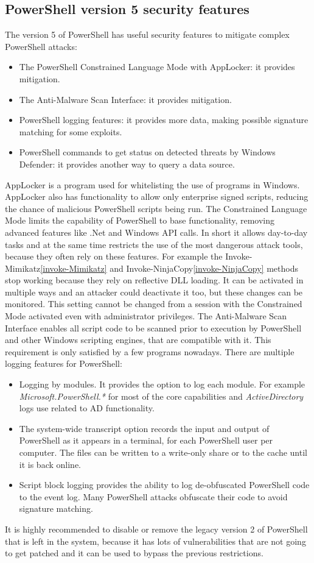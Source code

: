 \subsection{PowerShell version 5 security features}
The version 5 of PowerShell has useful security features to mitigate complex PowerShell attacks\cite{powershell_adsecurity}:
\begin{itemize}
	\item The PowerShell Constrained Language Mode with AppLocker: it provides mitigation.
	\item The Anti-Malware Scan Interface: it provides mitigation.
	\item PowerShell logging features: it provides more data, making possible signature matching for some exploits.
	\item PowerShell commands to get status on detected threats by Windows Defender: it provides another way to query a data source.
\end{itemize}
\linej
AppLocker is a program used for whitelisting the use of programs in Windows.
AppLocker also has functionality to allow only enterprise signed scripts, reducing the chance of malicious PowerShell scripts being run.
\linej
The Constrained Language Mode limits the capability of PowerShell to base functionality, removing advanced features like .Net and Windows API calls.
In short it allows day-to-day tasks and at the same time restricts the use of the most dangerous attack tools, because they often rely on these features.
For example the Invoke-Mimikatz\ref{invoke-Mimikatz} and Invoke-NinjaCopy\ref{invoke-NinjaCopy} methods stop working because they rely on reflective DLL loading.
\linej
It can be activated in multiple ways and an attacker could deactivate it too, but these changes can be monitored.
This setting cannot be changed from a session with the Constrained Mode activated even with administrator privileges.
\linej
\linej
The Anti-Malware Scan Interface enables all script code to be scanned prior to execution by PowerShell and other Windows scripting engines, that are compatible with it.
This requirement is only satisfied by a few programs nowadays.
\linej
\linej
There are multiple logging features for PowerShell:
\begin{itemize}
	\item Logging by modules. It provides the option to log each module. For example \textit{Microsoft.PowerShell.*} for most of the core capabilities and \textit{ActiveDirectory} logs use related to AD functionality.
	\item The system-wide transcript option records the input and output of PowerShell as it appears in a terminal, for each PowerShell user per computer.
The files can be written to a write-only share or to the cache until it is back online.
	\item Script block logging provides the ability to log de-obfuscated PowerShell code to the event log.
Many PowerShell attacks obfuscate their code to avoid signature matching.
\end{itemize}
\linej
It is highly recommended to disable or remove the legacy version 2 of PowerShell that is left in the system, because it has lots of vulnerabilities that are not going to get patched and it can be used to bypass the previous restrictions.

